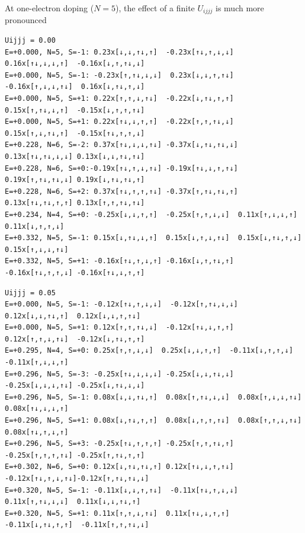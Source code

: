 \documentclass[12pt,a4paper]{scrartcl}
\numberwithin{equation}{section}
\begin{document}
At one-electron doping ($N=5$), the effect of a finite $U_{ijjj}$ is much more pronounced
\begin{small}
\begin{verbatim}
Uijjj = 0.00
E=+0.000, N=5, S=-1: 0.23x[↓,↓,↑↓,↑]  -0.23x[↑↓,↑,↓,↓]  0.16x[↑↓,↓,↓,↑]  -0.16x[↓,↑,↑↓,↓]   
E=+0.000, N=5, S=-1: -0.23x[↑,↑↓,↓,↓]  0.23x[↓,↓,↑,↑↓]  -0.16x[↑,↓,↓,↑↓]  0.16x[↓,↑↓,↑,↓]   
E=+0.000, N=5, S=+1: 0.22x[↑,↑,↓,↑↓]  -0.22x[↓,↑↓,↑,↑]  0.15x[↑,↑↓,↓,↑]  -0.15x[↓,↑,↑,↑↓]   
E=+0.000, N=5, S=+1: 0.22x[↑↓,↓,↑,↑]  -0.22x[↑,↑,↑↓,↓]  0.15x[↑,↓,↑↓,↑]  -0.15x[↑↓,↑,↑,↓]   
E=+0.228, N=6, S=-2: 0.37x[↑↓,↓,↓,↑↓] -0.37x[↓,↑↓,↑↓,↓] 0.13x[↑↓,↑↓,↓,↓] 0.13x[↓,↓,↑↓,↑↓]   
E=+0.228, N=6, S=+0:-0.19x[↑↓,↑,↓,↑↓] -0.19x[↑↓,↓,↑,↑↓] 0.19x[↑,↑↓,↑↓,↓] 0.19x[↓,↑↓,↑↓,↑]   
E=+0.228, N=6, S=+2: 0.37x[↑↓,↑,↑,↑↓] -0.37x[↑,↑↓,↑↓,↑] 0.13x[↑↓,↑↓,↑,↑] 0.13x[↑,↑,↑↓,↑↓]   
E=+0.234, N=4, S=+0: -0.25x[↓,↓,↑,↑]  -0.25x[↑,↑,↓,↓]  0.11x[↑,↓,↓,↑]  0.11x[↓,↑,↑,↓]   
E=+0.332, N=5, S=-1: 0.15x[↓,↑↓,↓,↑]  0.15x[↓,↑,↓,↑↓]  0.15x[↓,↑↓,↑,↓]  0.15x[↑,↓,↓,↑↓]   
E=+0.332, N=5, S=+1: -0.16x[↑↓,↑,↓,↑] -0.16x[↓,↑,↑↓,↑] -0.16x[↑↓,↑,↑,↓] -0.16x[↑↓,↓,↑,↑]
\end{verbatim}
\begin{verbatim}
Uijjj = 0.05
E=+0.000, N=5, S=-1: -0.12x[↑↓,↑,↓,↓]  -0.12x[↑,↑↓,↓,↓]  0.12x[↓,↓,↑↓,↑]  0.12x[↓,↓,↑,↑↓]   
E=+0.000, N=5, S=+1: 0.12x[↑,↑,↑↓,↓]  -0.12x[↑↓,↓,↑,↑]  0.12x[↑,↑,↓,↑↓]  -0.12x[↓,↑↓,↑,↑]   
E=+0.295, N=4, S=+0: 0.25x[↑,↑,↓,↓]  0.25x[↓,↓,↑,↑]  -0.11x[↓,↑,↑,↓]  -0.11x[↑,↓,↓,↑]   
E=+0.296, N=5, S=-3: -0.25x[↑↓,↓,↓,↓] -0.25x[↓,↓,↑↓,↓] -0.25x[↓,↓,↓,↑↓] -0.25x[↓,↑↓,↓,↓]   
E=+0.296, N=5, S=-1: 0.08x[↓,↓,↑↓,↑]  0.08x[↑,↑↓,↓,↓]  0.08x[↑,↓,↓,↑↓]  0.08x[↑↓,↓,↓,↑]   
E=+0.296, N=5, S=+1: 0.08x[↓,↑↓,↑,↑]  0.08x[↓,↑,↑,↑↓]  0.08x[↑,↑,↓,↑↓]  0.08x[↑↓,↑,↓,↑]   
E=+0.296, N=5, S=+3: -0.25x[↑↓,↑,↑,↑] -0.25x[↑,↑,↑↓,↑] -0.25x[↑,↑,↑,↑↓] -0.25x[↑,↑↓,↑,↑]   
E=+0.302, N=6, S=+0: 0.12x[↓,↑↓,↑↓,↑] 0.12x[↑↓,↓,↑,↑↓] -0.12x[↑↓,↑,↓,↑↓]-0.12x[↑,↑↓,↑↓,↓]   
E=+0.320, N=5, S=-1: -0.11x[↓,↓,↑,↑↓]  -0.11x[↑↓,↑,↓,↓]  0.11x[↑,↑↓,↓,↓]  0.11x[↓,↓,↑↓,↑]   
E=+0.320, N=5, S=+1: 0.11x[↑,↑,↓,↑↓]  0.11x[↑↓,↓,↑,↑]  -0.11x[↓,↑↓,↑,↑]  -0.11x[↑,↑,↑↓,↓]
\end{verbatim}
\end{small}
\end{document}
